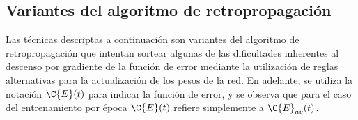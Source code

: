 %
\subsection{Variantes del algoritmo de retropropagación}
%
Las técnicas descriptas a continuación son variantes del algoritmo de
retropropagación que intentan sortear algunas de las dificultades
inherentes al descenso por gradiente de la función de error mediante
la utilización de reglas alternativas para la actualización de los
pesos de la red.
En adelante, se utiliza la notación $\C{E}(t)$ para indicar la función
de error, y se observa que para el caso del entrenamiento por época
$\C{E}(t)$ refiere simplemente a $\C{E}_{av}(t)$.
